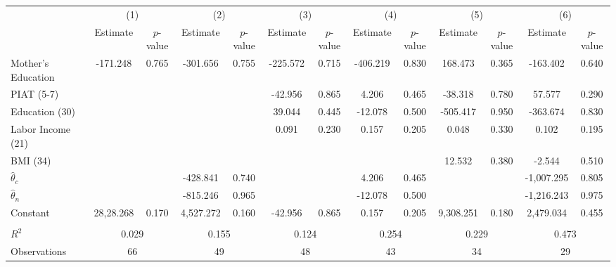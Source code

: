 \begin{tabular}{lcccccccccccc} \toprule
 & \multicolumn{2}{c}{(1)}  &  \multicolumn{2}{c}{(2)}  &  \multicolumn{2}{c}{(3)}  &  \multicolumn{2}{c}{(4)}  & \multicolumn{2}{c}{(5)} & \multicolumn{2}{c}{(6)} \\  
 & Estimate & $p$-value & Estimate & $p$-value & Estimate & $p$-value & Estimate & $p$-value & Estimate & $p$-value & Estimate & $p$-value \\ \midrule
Mother's Education &  -171.248 &     0.765 &  -301.656 &     0.755 &  -225.572 &     0.715 &  -406.219 &     0.830 &   168.473 &     0.365 &  -163.402 &     0.640 \\  
PIAT (5-7) &         &         &         &         &   -42.956 &     0.865 &     4.206 &     0.465 &   -38.318 &     0.780 &    57.577 &     0.290 \\  
Education (30) &         &         &         &         &    39.044 &     0.445 &   -12.078 &     0.500 &  -505.417 &     0.950 &  -363.674 &     0.830 \\  
Labor Income (21) &         &         &         &         &     0.091 &     0.230 &     0.157 &     0.205 &     0.048 &     0.330 &     0.102 &     0.195 \\  
BMI (34) &         &         &         &         &         &         &         &         &    12.532 &     0.380 &    -2.544 &     0.510 \\  
$\hat{\theta}_{c}$ &         &         &  -428.841 &     0.740 &         &         &     4.206 &     0.465 &         &         & -1,007.295 &     0.805 \\  
$\hat{\theta}_{n}$ &         &         &  -815.246 &     0.965 &         &         &   -12.078 &     0.500 &         &         & -1,216.243 &     0.975 \\ 
Constant &  28,28.268 &     0.170 &  4,527.272 &     0.160 &   -42.956 &     0.865 &     0.157 &     0.205 &  9,308.251 &     0.180 &  2,479.034 &     0.455 \\ \\ \midrule  
$R^2$ &     \multicolumn{2}{c}{0.029}  &     \multicolumn{2}{c}{0.155}  &     \multicolumn{2}{c}{0.124}   &     \multicolumn{2}{c}{0.254}  &     \multicolumn{2}{c}{0.229}  &     \multicolumn{2}{c}{0.473}  \\  
Observations &    \multicolumn{2}{c}{66}  &    \multicolumn{2}{c}{49} &    \multicolumn{2}{c}{48}  &    \multicolumn{2}{c}{43} &    \multicolumn{2}{c}{34}  &   \multicolumn{2}{c}{29}  \\  
\bottomrule \end{tabular} 
